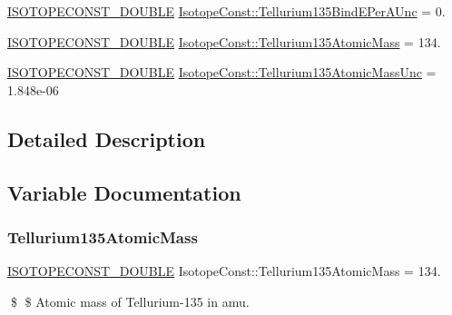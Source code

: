 \begin{DoxyCompactItemize}
\mbox{\hyperlink{group___isotope_const-_macros_ga8f45a7272ce02c0b4c65c44636ed719a}{I\+S\+O\+T\+O\+P\+E\+C\+O\+N\+S\+T\+\_\+\+D\+O\+U\+B\+LE}} \mbox{\hyperlink{group___isotope_const-_tellurium-_te135_gab130493ea9bf8b2e209260773d0fa9d7}{Isotope\+Const\+::\+Tellurium135\+Bind\+E\+Per\+A\+Unc}} = 0.
\item 
\mbox{\hyperlink{group___isotope_const-_macros_ga8f45a7272ce02c0b4c65c44636ed719a}{I\+S\+O\+T\+O\+P\+E\+C\+O\+N\+S\+T\+\_\+\+D\+O\+U\+B\+LE}} \mbox{\hyperlink{group___isotope_const-_tellurium-_te135_ga755bd609647a12a347619a4d9d89e724}{Isotope\+Const\+::\+Tellurium135\+Atomic\+Mass}} = 134.
\item 
\mbox{\hyperlink{group___isotope_const-_macros_ga8f45a7272ce02c0b4c65c44636ed719a}{I\+S\+O\+T\+O\+P\+E\+C\+O\+N\+S\+T\+\_\+\+D\+O\+U\+B\+LE}} \mbox{\hyperlink{group___isotope_const-_tellurium-_te135_ga3ab0dda627db4c7783499c4597fae2d5}{Isotope\+Const\+::\+Tellurium135\+Atomic\+Mass\+Unc}} = 1.\+848e-\/06
\end{DoxyCompactItemize}


\subsection{Detailed Description}


\subsection{Variable Documentation}
\mbox{\label{group___isotope_const-_tellurium-_te135_ga755bd609647a12a347619a4d9d89e724}} 
\subsubsection{\texorpdfstring{Tellurium135\+Atomic\+Mass}{Tellurium135AtomicMass}}
{\footnotesize\ttfamily \mbox{\hyperlink{group___isotope_const-_macros_ga8f45a7272ce02c0b4c65c44636ed719a}{I\+S\+O\+T\+O\+P\+E\+C\+O\+N\+S\+T\+\_\+\+D\+O\+U\+B\+LE}} Isotope\+Const\+::\+Tellurium135\+Atomic\+Mass = 134.}

\$ \$ Atomic mass of Tellurium-\/135 in amu. \mbox{\label{group___isotope_const-_tellurium-_te135_ga3ab0dda627db4c7783499c4597fae2d5}} 
